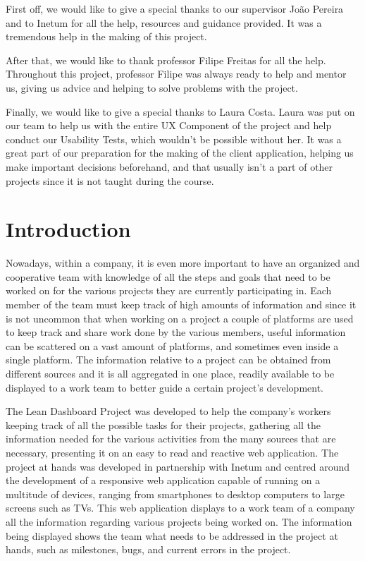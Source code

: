 \documentclass[a4paper,twoside,10pt]{report}
\begin{document}
First off, we would like to give a special thanks to our supervisor João Pereira and to Inetum for all the help, resources and guidance provided. It was a tremendous help in the making of this project.

After that, we would like to thank professor Filipe Freitas for all the help.
Throughout this project, professor Filipe was always ready to help and mentor us, giving us advice and helping to solve problems with the project.

Finally, we would like to give a special thanks to Laura Costa. Laura was put on our team to help us with the entire UX Component of the project and help conduct our Usability Tests, which wouldn't be possible without her. It was a great part of our preparation for the making of the client application, helping us make important decisions beforehand, and that usually isn't a part of other projects since it is not taught during the course.
\newpage
\tableofcontents{}
\newpage

\chapter{Introduction}

Nowadays, within a company, it is even more important to have an organized and cooperative team with knowledge of all the steps and goals that need to be worked on for the various projects they are currently participating in.
Each member of the team must keep track of high amounts of information and since it is not uncommon that when working on a project a couple of platforms are used to keep track and share work done by the various members, useful information can be scattered on a vast amount of platforms, and sometimes even inside a single platform.
The information relative to a project can be obtained from different sources and it is all aggregated in one place, readily available to be displayed to a work team to better guide a certain project's development.

The Lean Dashboard Project was developed to help the company's workers keeping track of all the possible tasks for their projects, gathering all the information needed for the various activities from the many sources that are necessary, presenting it on an easy to read and reactive web application.
The project at hands was developed in partnership with Inetum\cite{INETUM} and centred around the development of a responsive web application capable of running on a multitude of devices, ranging from smartphones to desktop computers to large screens such as TVs. This web application displays to a work team of a company all the information regarding various projects being worked on. 
The information being displayed shows the team what needs to be addressed in the project at hands, such as milestones, bugs, and current errors in the project.
\end{document}
